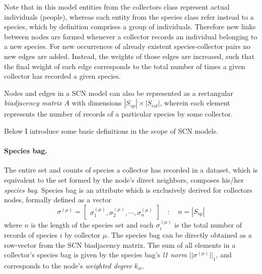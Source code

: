 Note that in this model entities from the collectors class represent actual individuals (people), whereas each entity from the species class refer instead to a species, which by definition comprises a group of individuals. 
Therefore new links between nodes are formed whenever a collector records an individual belonging to a new species. 
For new occurrences of already existent species-collector pairs no new edges are added. Instead, the weights of those edges are increased, such that the final weight of each edge corresponds to the total number of times a given collector has recorded a given species.

Nodes and edges in a SCN model can also be represented as a rectangular \textit{biadjacency matrix} $A$ with dimensions $|S_{sp}|\times|S_{col}|$, wherein each element represents the number of records of a particular species by some collector.

Below I introduce some basic definitions in the scope of SCN models.

\paragraph{Species bag.} 
The entire set and counts of species a collector has recorded in a dataset, which is equivalent to the set formed by the node's direct neighbors, composes his/her \textit{species bag}.
Species bag is an attribute which is exclusively derived for collectors nodes, formally defined as a vector
$$
\sigma^{(\mu)} =  \begin{bmatrix}
\sigma_1^{(\mu)}, \sigma_2^{(\mu)}, \cdots, \sigma_n^{(\mu)}
\end{bmatrix}  \quad : \quad 
n = |S_{sp}|
$$
where $n$ is the length of the species set and each $\sigma_i^{(\mu)}$ is the total number of records of species $i$ by collector $\mu$. 
The species bag can be directly obtained as a row-vector from the SCN biadjacency matrix.
The sum of all elements in a collector's species bag is given by the species bag's \textit{l1 norm} $|| \sigma^{(\mu)} ||_1$, and corresponds to the node's \textit{weighted degree} $k_w$.
 
